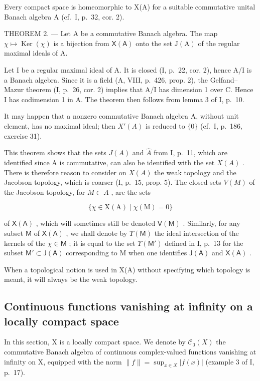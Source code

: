 Every compact space is homeomorphic to X(A) for a suitable commutative unital Banach algebra A (cf.~I, p.~32, cor. 2).

THEOREM 2. --- Let A be a commutative Banach algebra. The map \(\chi \mapsto \operatorname{Ker}(\chi)\) is a bijection from \(\mathsf{X}(\mathsf{A})\) onto the set \(\mathrm{J}(\mathrm{A})\) of the regular maximal ideals of A.

Let I be a regular maximal ideal of A. It is closed (I, p.~22, cor. 2), hence A/I is a Banach algebra. Since it is a field (A, VIII, p.~426, prop. 2), the Gelfand--Mazur theorem (I, p.~26, cor. 2) implies that A/I has dimension 1 over C. Hence I has codimension 1 in A. The theorem then follows from lemma 3 of I, p.~10.

It may happen that a nonzero commutative Banach algebra A, without unit element, has no maximal ideal; then \(X'(A)\) is reduced to \(\{0\}\) (cf.~I, p.~186, exercise 31).

This theorem shows that the sets \(J(A)\) and \(\hat{A}\) from I, p.~11, which are identified since A is commutative, can also be identified with the set \(X(A)\) . There is therefore reason to consider on \(X(A)\) the weak topology and the Jacobson topology, which is coarser (I, p.~15, prop. 5). The closed sets \(V(M)\) of the Jacobson topology, for \(M \subset A\) , are the sets

\[
\{\chi \in \mathrm{X} (\mathrm{A}) \mid \chi (\mathrm{M}) = 0 \}
\]

of \(\mathsf{X}(\mathsf{A})\) , which will sometimes still be denoted \(\mathsf{V}(\mathsf{M})\) . Similarly, for any subset \(\mathsf{M}\) of \(\mathsf{X}(\mathsf{A})\) , we shall denote by \(\Upsilon(\mathsf{M})\) the ideal intersection of the kernels of the \(\chi \in \mathsf{M}\) ; it is equal to the set \(\Upsilon(\mathsf{M}')\) defined in I, p.~13 for the subset \(\mathsf{M}' \subset \mathsf{J}(\mathsf{A})\) corresponding to M when one identifies \(\mathsf{J}(\mathsf{A})\) and \(\mathsf{X}(\mathsf{A})\) .

When a topological notion is used in X(A) without specifying which topology is meant, it will always be the weak topology.

\subsection{Continuous functions vanishing at infinity on a locally compact space}

In this section, X is a locally compact space. We denote by \(\mathcal{C}_{0}(X)\) the commutative Banach algebra of continuous complex-valued functions vanishing at infinity on X, equipped with the norm \(\|f\|=\sup_{x\in X}|f(x)|\) (example 3 of I, p.~17).

